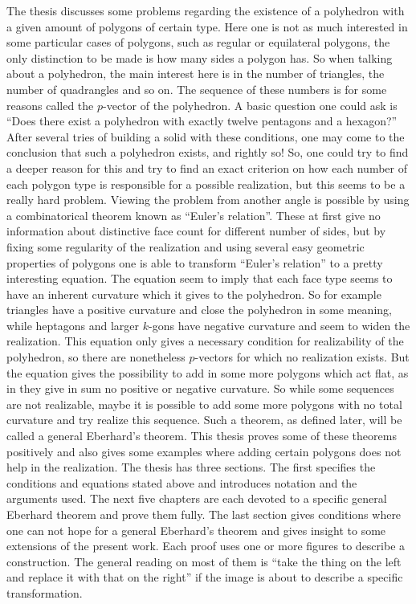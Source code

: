 The thesis discusses some problems regarding the existence of a polyhedron with a given amount of polygons of certain type. Here one is not as much interested in some particular cases of polygons, such as regular or equilateral polygons, the only distinction to be made is how many sides a polygon has. So when talking about a polyhedron, the main interest here is in the number of triangles, the number of quadrangles and so on. The sequence of these numbers is for some reasons called the $p$-vector of the polyhedron. A basic question one could ask is ``Does there exist a polyhedron with exactly twelve pentagons and a hexagon?'' After several tries of building a solid with these conditions, one may come to the conclusion that such a polyhedron exists, and rightly so! So, one could try to find a deeper reason for this and try to find an exact criterion on how each number of each polygon type is responsible for a possible realization, but this seems to be a really hard problem. Viewing the problem from another angle is possible by using a combinatorical theorem known as ``Euler's relation''. These at first give no information about distinctive face count for different number of sides, but by fixing some regularity of the realization and using several easy geometric properties of polygons one is able to transform ``Euler's relation'' to a pretty interesting equation. The equation seem to imply that each face type seems to have an inherent curvature which it gives to the polyhedron. So for example triangles have a positive curvature and close the polyhedron in some meaning, while heptagons and larger $k$-gons have negative curvature and seem to widen the realization. This equation only gives a necessary condition for realizability of the polyhedron, so there are nonetheless $p$-vectors for which no realization exists. But the equation gives the possibility to add in some more polygons which act flat, as in they give in sum no positive or negative curvature. So while some sequences are not realizable, maybe it is possible to add some more polygons with no total curvature and try realize this sequence. Such a theorem, as defined later, will be called a general Eberhard's theorem. This thesis proves some of these theorems positively and also gives some examples where adding certain polygons does not help in the realization. The thesis has three sections. The first specifies the conditions and equations stated above and introduces notation and the arguments used. The next five chapters are each devoted to a specific general Eberhard theorem and prove them fully. The last section gives conditions where one can not hope for a general Eberhard's theorem and gives insight to some extensions of the present work. Each proof uses one or more figures to describe a construction. The general reading on most of them is ``take the thing on the left and replace it with that on the right'' if the image is about to describe a specific transformation.